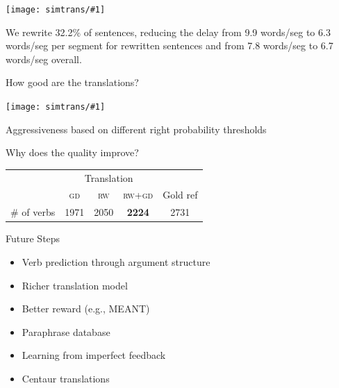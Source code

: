 \documentclass[xcolor=dvipsnames]{beamer}
\newcommand{\abr}[1]{\textsc{#1} }
\newcommand{\gfxs}[2]{
\begin{center}
	\texttt{[image: simtrans/\#1]}
\end{center}
}
\begin{document}
\begin{frame}{}

\gfxs{rewrite_eval}{.8}
\pause
We rewrite 32.2\% of
sentences, reducing the delay from 9.9 words/seg to 6.3 words/seg per
segment for rewritten sentences and from 7.8 words/seg to 6.7 words/seg overall.

\end{frame}

\begin{frame}{How good are the translations?}

  \gfxs{tradeoff-rw-bleu}{.7}

\begin{center}
Aggressiveness based on different right probability thresholds
\cite{fujita-13}
\end{center}

\end{frame}

\begin{frame}{Why does the quality improve?}

\begin{center}
\begin{tabular}{ccccc}
\toprule
& \multicolumn{3}{c}{Translation} & \\
\cmidrule{2-4}
& \abr{gd} & \abr{rw} & \abr{rw+gd} & Gold ref \\
\midrule
\# of verbs & 1971 & 2050 & {\bf 2224} & 2731 \\
\bottomrule
\end{tabular}
\end{center}

\end{frame}

\begin{frame}{Future Steps}

  \begin{itemize}
    \item Verb prediction through argument structure 
    \item Richer translation model~\cite{oda-15,cho-16}
    \item Better reward (e.g., MEANT)  
    \item Paraphrase database
    \item Learning from imperfect feedback  
    \item Centaur translations  
  \end{itemize}

\end{frame}
\end{document}
